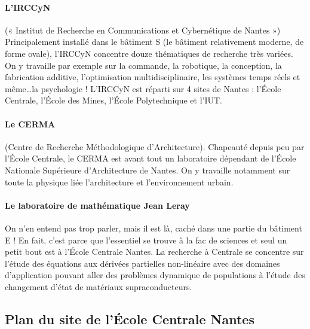 \paragraph{L'IRCCyN} (« Institut de Recherche en Communications et Cybernétique de Nantes ») Principalement installé dans le bâtiment S (le bâtiment relativement moderne, de forme ovale), l'IRCCyN concentre douze thématiques de recherche très variées. On y travaille par exemple sur la commande, la robotique, la conception, la fabrication additive, l'optimisation multidisciplinaire, les systèmes temps réels et même\dots la psychologie ! L'IRCCyN est réparti sur 4 sites de Nantes : l'École Centrale, l'École des Mines, l'École Polytechnique et l'IUT.
\paragraph{Le CERMA} (Centre de Recherche Méthodologique d'Architecture). Chapeauté depuis peu par l'École Centrale, le CERMA est avant tout un laboratoire dépendant de l'École Nationale Supérieure d'Architecture de Nantes. On y travaille notamment sur toute la physique liée l'architecture et l'environnement urbain.
\paragraph{Le laboratoire de mathématique Jean Leray} On n'en entend pas trop parler, mais il est là, caché dans une partie du bâtiment E ! En fait, c'est parce que l'essentiel se trouve à la fac de sciences et seul un petit bout est à l'École Centrale Nantes. La recherche à Centrale se concentre sur l'étude des équations aux dérivées partielles non-linéaire avec des domaines d'application pouvant aller des problèmes dynamique de populations à l'étude des changement d'état de matériaux supraconducteurs.

\subsection{Plan du site de l’École Centrale Nantes}\trad
{}
